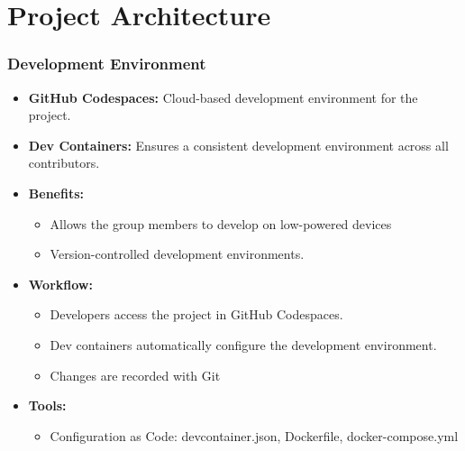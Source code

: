 \documentclass{beamer}
\begin{document}
\section{Project Architecture}
\begin{frame}
\frametitle{Development Environment}
\begin{itemize}
    \item \textbf{GitHub Codespaces:} Cloud-based development environment for the project.
    
    \item \textbf{Dev Containers:} Ensures a consistent development environment across all contributors.

    \item \textbf{Benefits:}
      \begin{itemize}
        \item Allows the group members to develop on low-powered devices
        \item Version-controlled development environments.
      \end{itemize}

    \item \textbf{Workflow:}
      \begin{itemize}
        \item Developers access the project in GitHub Codespaces.
        \item Dev containers automatically configure the development environment.
        \item Changes are recorded with Git
      \end{itemize}

    \item \textbf{Tools:}
      \begin{itemize}
        \item Configuration as Code:  devcontainer.json, Dockerfile, docker-compose.yml
      \end{itemize}
  \end{itemize}
\end{frame}
\end{document}
